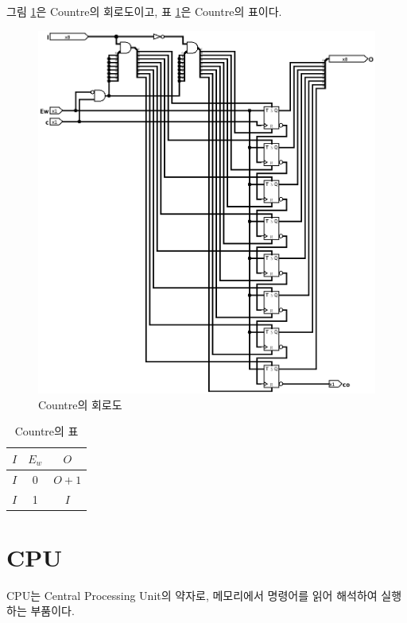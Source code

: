 \documentclass{article}
\renewcommand{\figurename}{그림}
\renewcommand{\tablename}{표}
\begin{document}
\figurename{} \ref{fig:ctr}은 Countre의 회로도이고,
\tablename{} \ref{tab:ctr}은 Countre의 표이다.

\begin{figure}[h]
    \centering
    \includegraphics[scale=0.35]{Countre}
    \caption{Countre의 회로도}
    \label{fig:ctr}
\end{figure}

\begin{table}[h]
    \centering
    \begin{tabular}{cc|c}
        $I$ & $E_w$ & $O$ \\
        \hline
        $I$ & 0 & $O+1$ \\
        $I$ & 1 & $I$ \\
    \end{tabular}
    \caption{Countre의 표}
    \label{tab:ctr}
\end{table}

\section{CPU}

CPU는 Central Processing Unit의 약자로,
메모리에서 명령어를 읽어 해석하여 실행하는 부품이다.
\end{document}
